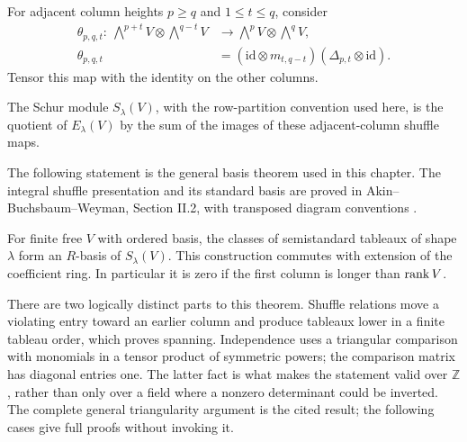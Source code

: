 For adjacent column heights \(p\ge q\) and \(1\le t\le q\), consider
\[
 \begin{split}
 \theta_{p,q,t}:\ 
 \bigwedge^{p+t}V\otimes\bigwedge^{q-t}V
 &\longrightarrow \bigwedge^pV\otimes\bigwedge^qV,\\
 \theta_{p,q,t}
 &= (\mathrm{id}\otimes m_{t,q-t})
       (\Delta_{p,t}\otimes\mathrm{id}).
 \end{split}
\]
Tensor this map with the identity on the other columns.

\begin{definition}
The Schur module \(S_\lambda(V)\), with the row-partition convention
used here, is the quotient of \(E_\lambda(V)\) by the sum of the
images of these adjacent-column shuffle maps.
\end{definition}

The following statement is the general basis theorem used in this
chapter.  The integral shuffle presentation and its standard basis
are proved in Akin--Buchsbaum--Weyman, Section II.2, with transposed
diagram conventions \cite{smtABW1982}.

\begin{theorem}
For finite free \(V\) with ordered basis, the classes of
semistandard tableaux of shape \(\lambda\) form an \(R\)-basis of
\(S_\lambda(V)\).  This construction commutes with extension of
the coefficient ring.  In particular it is zero if the first
column is longer than \(\operatorname{rank} V\).
\end{theorem}

There are two logically distinct parts to this theorem.  Shuffle
relations move a violating entry toward an earlier column and
produce tableaux lower in a finite tableau order, which proves
spanning.  Independence uses a triangular comparison with monomials
in a tensor product of symmetric powers; the comparison matrix
has diagonal entries one.  The latter fact is what makes the
statement valid over \(\mathbb Z\), rather than only over a field
where a nonzero determinant could be inverted.  The complete
general triangularity argument is the cited result; the following
cases give full proofs without invoking it.

